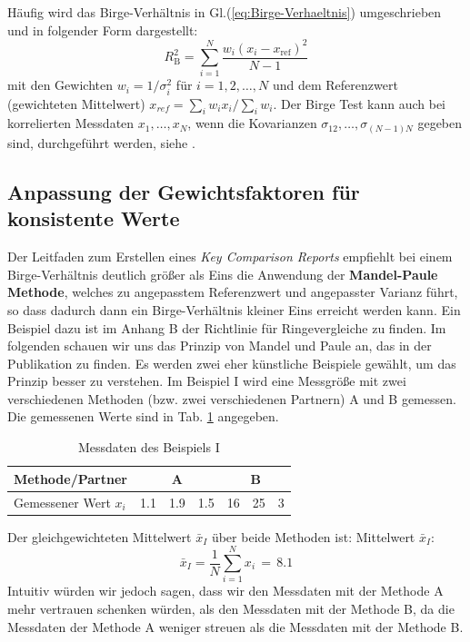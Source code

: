 Häufig wird das Birge-Verhältnis in Gl.(\ref{eq:Birge-Verhaeltnis}) 
umgeschrieben und in folgender Form dargestellt:
\begin{equation}
R_\mathrm{B}^2 = \sum_{i=1}^N \frac{w_i (x_i - x_\mathrm{ref})^2}{N-1}
\end{equation}
mit den Gewichten $w_i = 1/\sigma_i^2$ für $i=1,2,\ldots, N$ und dem 
Referenzwert (gewichteten Mittelwert) $x_{ref}=\sum_i w_i x_i / \sum_i w_i$.
Der Birge Test kann auch bei korrelierten Messdaten $x_1,\ldots ,x_N$, wenn die 
Kovarianzen $\sigma_{12},\ldots, \sigma_{(N-1)N}$ gegeben sind, durchgeführt werden, siehe \cite{Kac08}.

\subsection{Anpassung der Gewichtsfaktoren für konsistente Werte}
Der Leitfaden zum Erstellen eines \textsl{Key Comparison Reports}
\cite{GuideKey} empfiehlt bei einem Birge-Verhältnis deutlich größer als Eins die Anwendung
der \textbf{Mandel-Paule Methode}, welches zu angepasstem Referenzwert und angepasster Varianz führt,
so dass dadurch dann ein Birge-Verhältnis kleiner Eins erreicht werden kann.
Ein Beispiel dazu ist im Anhang B der Richtlinie für Ringevergleiche \cite{GuideKey} zu finden.
Im folgenden schauen wir uns das Prinzip von Mandel und Paule an, das 
in der Publikation \cite{Pau82} zu finden. Es werden zwei eher künstliche Beispiele gewählt, um das Prinzip besser zu verstehen. 
Im Beispiel I wird eine Messgröße mit zwei verschiedenen Methoden (bzw. zwei verschiedenen Partnern) A und B gemessen. Die gemessenen Werte sind in Tab. \ref*{tab:Beispiel_I}
angegeben. 
\begin{table}[!htb]
	\caption{Messdaten des Beispiels I}
	\begin{center}
	\begin{tabular}{l| rrr |rrr}
		\hline 
		Methode/Partner & \multicolumn{3}{c}{A} \vline & \multicolumn{3}{c}{B} \\ \hline
		Gemessener Wert $x_i$ & 1.1 & 1.9 & 1.5 & 16 & 25 & 3 \\ \hline
	\end{tabular}
\end{center}
\label{tab:Beispiel_I}
\end{table}
Der gleichgewichteten Mittelwert $\bar x_I$ über beide Methoden ist:
 Mittelwert $\bar x_I$: 
 \begin{equation}
 \bar x_I = \frac{1}{N} \sum_{i=1}^N x_i \, = \, 8.1
 \end{equation}
 Intuitiv würden wir jedoch sagen, dass wir den Messdaten mit der Methode A
 mehr vertrauen schenken würden, als den Messdaten mit der Methode B, da die 
 Messdaten der Methode A weniger streuen als die Messdaten mit der Methode B.

